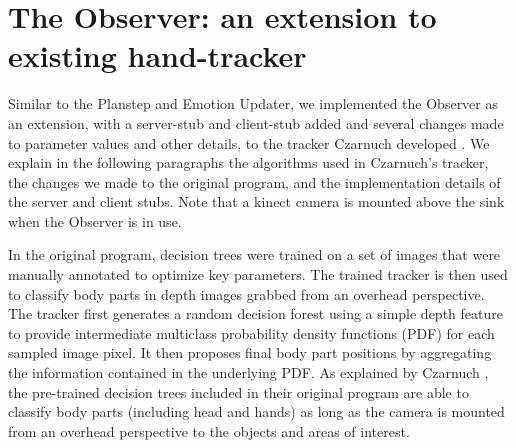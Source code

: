 \section{The Observer: an extension to existing hand-tracker}

Similar to the Planstep and Emotion Updater, we implemented the Observer as an extension, with a server-stub and client-stub added and several changes made to parameter values and other details, to the tracker Czarnuch developed \cite{czarnuch2014}. We explain in the following paragraphs the algorithms used in Czarnuch's tracker, the changes we made to the original program, and the implementation details of the server and client stubs. Note that a kinect camera is mounted above the sink when the Observer is in use.

In the original program, decision trees were trained on a set of images that were manually annotated to optimize key parameters. The trained tracker is then used to classify body parts in depth images grabbed from an overhead perspective. The tracker first generates a random decision forest using a simple depth feature to provide intermediate multiclass probability density functions (PDF) for each sampled image pixel. It then proposes final body part positions by aggregating the information contained in the underlying PDF. As explained by Czarnuch \cite{czarnuch2014}, the pre-trained decision trees included in their original program are able to classify body parts (including head and hands) as long as the camera is mounted from an overhead perspective to the objects and areas of interest. 


